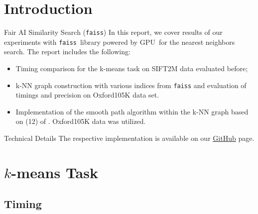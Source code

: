 \section{Introduction}

\begin{frame}
	\begin{block}{Fair AI Similarity Search (\texttt{faiss})}
		In this report, we cover results of our experiments with \texttt{faiss}\footnotemark \, library \cite{Johnson2017} powered by GPU\footnotemark \, for the nearest neighbors search. The report includes the following:
		\begin{itemize}
			\item Timing comparison for the k-means task on SIFT2M data evaluated before;
			\item k-NN graph construction with various indices from \texttt{faiss} and evaluation of timings and precision on Oxford105K data set.
			\item Implementation of the smooth path algorithm within the k-NN graph based on (12) of \cite{Johnson2017}. Oxford105K data was utilized.
		\end{itemize}
	\end{block}
	
	\begin{block}{Technical Details}
		The respective implementation is available on our \href{https://github.com/salisaresama/computer-vision}{{\color{blue}\underline{GitHub}}} page.
	\end{block}
	
	\addtocounter{footnote}{-2}
\end{frame}


\section{$k$-means Task}
\subsection{Timing}


